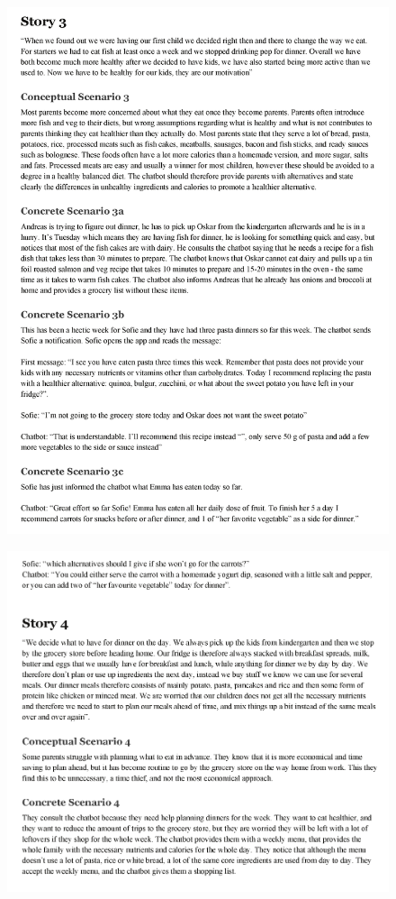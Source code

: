     \begin{figure}
        \centering
        \includegraphics[scale=0.8]{figures/scenario3.pdf}
    \end{figure}
    \begin{figure}
        \centering
        \includegraphics[scale=0.8]{figures/scenario4.pdf}
    \end{figure}
    

